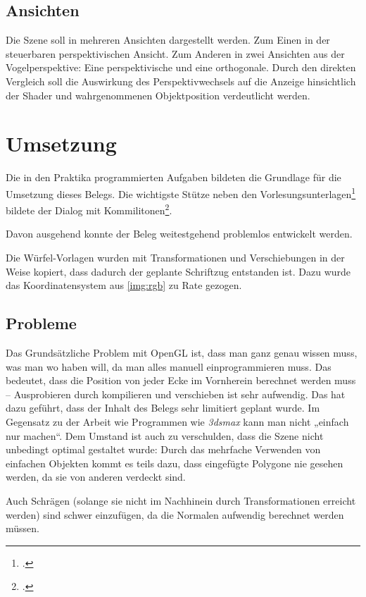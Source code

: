 \documentclass{scrreprt}
\begin{document}
\subsection{Ansichten}
Die Szene soll in mehreren Ansichten dargestellt werden. Zum Einen in der steuerbaren perspektivischen Ansicht. Zum Anderen in zwei Ansichten aus der Vogelperspektive: Eine perspektivische und eine orthogonale. Durch den direkten Vergleich soll die Auswirkung des Perspektivwechsels auf die Anzeige hinsichtlich der Shader und wahrgenommenen Objektposition verdeutlicht werden.

\section{Umsetzung}
Die in den Praktika programmierten Aufgaben bildeten die Grundlage für die Umsetzung dieses Belegs. Die wichtigste Stütze neben den Vorlesungsunterlagen\footcite{Oertel2017vl} bildete der Dialog mit Kommilitonen\footcite{kommilitonen}.

Davon ausgehend konnte der Beleg weitestgehend problemlos entwickelt werden.

Die Würfel-Vorlagen wurden mit Transformationen und Verschiebungen in der Weise kopiert, dass dadurch der geplante Schriftzug entstanden ist. Dazu wurde das Koordinatensystem aus \autoref{img:rgb} zu Rate gezogen.

\subsection{Probleme}

Das Grundsätzliche Problem mit OpenGL ist, dass man ganz genau wissen muss, was man wo haben will, da man alles manuell einprogrammieren muss. Das bedeutet, dass die Position von jeder Ecke im Vornherein berechnet werden muss -- Ausprobieren durch kompilieren und verschieben ist sehr aufwendig. Das hat dazu geführt, dass der Inhalt des Belegs sehr limitiert geplant wurde. Im Gegensatz zu der Arbeit wie Programmen wie \emph{3dsmax} kann man nicht „einfach nur machen“. Dem Umstand ist auch zu verschulden, dass die Szene nicht unbedingt optimal gestaltet wurde: Durch das mehrfache Verwenden von einfachen Objekten kommt es teils dazu, dass eingefügte Polygone nie gesehen werden, da sie von anderen verdeckt sind.

Auch Schrägen (solange sie nicht im Nachhinein durch Transformationen erreicht werden) sind schwer einzufügen, da die Normalen aufwendig berechnet werden müssen.
\end{document}
